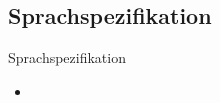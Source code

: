 \documentclass{beamer}
\begin{document}
\subsection{Sprachspezifikation}

\begin{frame}{Sprachspezifikation}
	\begin{itemize}
		\item
	\end{itemize}
\end{frame}

%
%
%
%
%
%
%
%  
\end{document}

